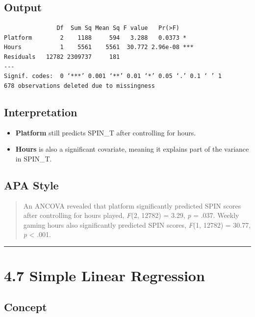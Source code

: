 \documentclass[
]{book}
\providecommand{\tightlist}{%
  \setlength{\itemsep}{0pt}\setlength{\parskip}{0pt}}
\begin{document}
\subsection{Output}\label{output-5}

\begin{verbatim}
               Df  Sum Sq Mean Sq F value   Pr(>F)    
Platform        2    1188     594   3.288   0.0373 *  
Hours           1    5561    5561  30.772 2.96e-08 ***
Residuals   12782 2309737     181                     
---
Signif. codes:  0 ‘***’ 0.001 ‘**’ 0.01 ‘*’ 0.05 ‘.’ 0.1 ‘ ’ 1
678 observations deleted due to missingness
\end{verbatim}

\subsection{Interpretation}\label{interpretation-5}

\begin{itemize}
\tightlist
\item
  \textbf{Platform} still predicts SPIN\_T after controlling for hours.
\item
  \textbf{Hours} is also a significant covariate, meaning it explains part of the variance in SPIN\_T.
\end{itemize}

\subsection{APA Style}\label{apa-style-3}

\begin{quote}
An ANCOVA revealed that platform significantly predicted SPIN scores after controlling for hours played, \emph{F}(2, 12782) = 3.29, \emph{p} = .037. Weekly gaming hours also significantly predicted SPIN scores, \emph{F}(1, 12782) = 30.77, \emph{p} \textless{} .001.
\end{quote}

\begin{center}\rule{0.5\linewidth}{0.5pt}\end{center}

\section{4.7 Simple Linear Regression}\label{simple-linear-regression}

\subsection{Concept}\label{concept-6}
\end{document}
